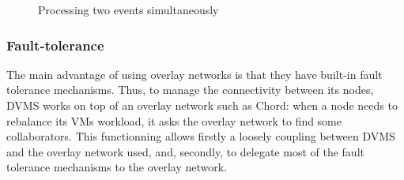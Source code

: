 \begin{figure}[h]
%
%
%
%
\caption{Processing two events simultaneously\label{fig:dvms_pte}}
\end{figure}


\subsubsection{Fault-tolerance}
%

The main advantage of using overlay networks is that they have built-in fault
tolerance mechanisms. Thus, to manage the connectivity between its nodes, DVMS
works on top of an overlay network such as Chord: when a node needs to rebalance
its VMs workload, it asks the overlay network to find some
collaborators.
This functionning allows firstly a loosely coupling between DVMS and the overlay
network used, and, secondly, to delegate most of the fault tolerance mechanisms
to the overlay network.


